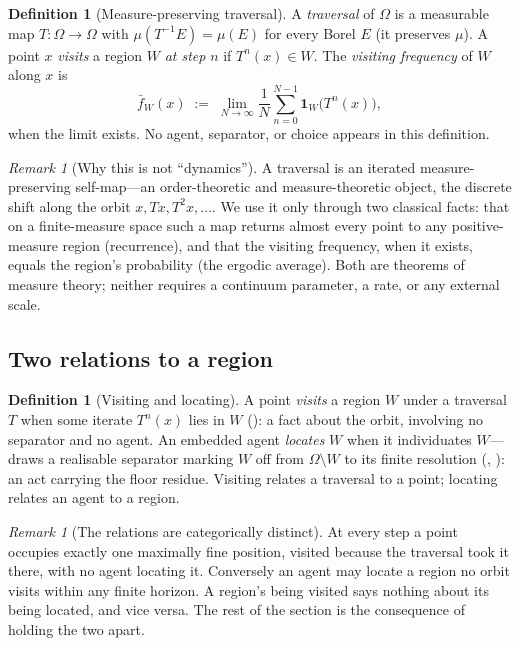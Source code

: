\documentclass[11pt,twocolumn,a4paper]{article}
\theoremstyle{thmstyle}
\theoremstyle{definition}
\newtheorem{definition}[theorem]{Definition}
\theoremstyle{remark}
\newtheorem{remark}[theorem]{Remark}
\newcommand{\Space}{\Omega}
\begin{document}
\begin{definition}[Measure-preserving traversal]
\label{def:traversal}
A \emph{traversal} of $\Space$ is a measurable map $T\colon\Space\to\Space$ with
$\mu(T^{-1}E)=\mu(E)$ for every Borel $E$ \textup{(}it preserves $\mu$\textup{)}.
A point $x$ \emph{visits} a region $W$ \emph{at step} $n$ if $T^{n}(x)\in W$. The
\emph{visiting frequency} of $W$ along $x$ is
\[
\bar f_W(x)\;:=\;\lim_{N\to\infty}\frac1N\sum_{n=0}^{N-1}\mathbf 1_W\!\bigl(T^{n}(x)\bigr),
\]
when the limit exists. No agent, separator, or choice appears in this definition.
\end{definition}

\begin{remark}[Why this is not ``dynamics'']
\label{rem:not-dynamics}
A traversal is an iterated measure-preserving self-map---an order-theoretic and
measure-theoretic object, the discrete shift along the orbit
$x,Tx,T^2x,\dots$. We use it only through two classical facts: that on a
finite-measure space such a map returns almost every point to any positive-measure
region (recurrence), and that the visiting frequency, when it exists, equals the
region's probability (the ergodic average). Both are theorems of measure theory;
neither requires a continuum parameter, a rate, or any external scale.
\end{remark}

\subsection{Two relations to a region}

\begin{definition}[Visiting and locating]
\label{def:visit-locate}
A point \emph{visits} a region $W$ under a traversal $T$ when some iterate
$T^{n}(x)$ lies in $W$ \textup{(}\textup{)}: a fact about the
orbit, involving no separator and no agent. An embedded agent \emph{locates} $W$
when it individuates $W$---draws a realisable separator marking $W$ off from
$\Space\setminus W$ to its finite resolution \textup{(},
\textup{)}: an act carrying the floor residue. Visiting
relates a traversal to a point; locating relates an agent to a region.
\end{definition}

\begin{remark}[The relations are categorically distinct]
\label{rem:two-relations}
At every step a point occupies exactly one maximally fine position, visited
because the traversal took it there, with no agent locating it. Conversely an
agent may locate a region no orbit visits within any finite horizon. A region's
being visited says nothing about its being located, and vice versa. The rest of
the section is the consequence of holding the two apart.
\end{remark}
\end{document}
